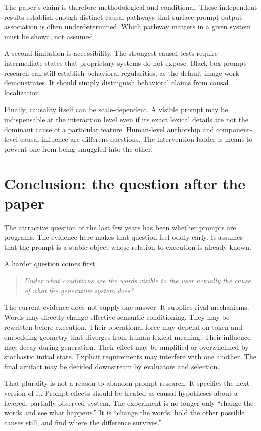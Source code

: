 \documentclass[11pt]{article}
\begin{document}
The paper's claim is therefore methodological and conditional. These independent results establish enough distinct causal pathways that surface prompt-output association is often underdetermined. Which pathway matters in a given system must be shown, not assumed.

A second limitation is accessibility. The strongest causal tests require intermediate states that proprietary systems do not expose. Black-box prompt research can still establish behavioral regularities, as the default-image work demonstrates. It should simply distinguish behavioral claims from causal localization.

Finally, causality itself can be scale-dependent. A visible prompt may be indispensable at the interaction level even if its exact lexical details are not the dominant cause of a particular feature. Human-level authorship and component-level causal influence are different questions. The intervention ladder is meant to prevent one from being smuggled into the other.

\section{Conclusion: the question after the paper}

The attractive question of the last few years has been whether prompts are programs. The evidence here makes that question feel oddly early. It assumes that the prompt is a stable object whose relation to execution is already known.

A harder question comes first.

\begin{quote}
\emph{Under what conditions are the words visible to the user actually the cause of what the generative system does?}
\end{quote}

The current evidence does not supply one answer. It supplies rival mechanisms. Words may directly change effective semantic conditioning. They may be rewritten before execution. Their operational force may depend on token and embedding geometry that diverges from human lexical meaning. Their influence may decay during generation. Their effect may be amplified or overwhelmed by stochastic initial state. Explicit requirements may interfere with one another. The final artifact may be decided downstream by evaluators and selection.

That plurality is not a reason to abandon prompt research. It specifies the next version of it. Prompt effects should be treated as causal hypotheses about a layered, partially observed system. The experiment is no longer only ``change the words and see what happens.'' It is ``change the words, hold the other possible causes still, and find where the difference survives.''
\end{document}
